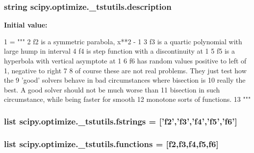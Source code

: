 \subsubsection[{description}]{\setlength{\rightskip}{0pt plus 5cm}string scipy.\+optimize.\+\_\+tstutils.\+description}\label{namespacescipy_1_1optimize_1_1__tstutils_aa462cb2cefb11320f53df0f3880533d1}
{\bfseries Initial value\+:}
\begin{DoxyCode}
1 = \textcolor{stringliteral}{"""}
2 \textcolor{stringliteral}{f2 is a symmetric parabola, x**2 - 1}
3 \textcolor{stringliteral}{f3 is a quartic polynomial with large hump in interval}
4 \textcolor{stringliteral}{f4 is step function with a discontinuity at 1}
5 \textcolor{stringliteral}{f5 is a hyperbola with vertical asymptote at 1}
6 \textcolor{stringliteral}{f6 has random values positive to left of 1, negative to right}
7 \textcolor{stringliteral}{}
8 \textcolor{stringliteral}{of course these are not real problems. They just test how the}
9 \textcolor{stringliteral}{'good' solvers behave in bad circumstances where bisection is}
10 \textcolor{stringliteral}{really the best. A good solver should not be much worse than}
11 \textcolor{stringliteral}{bisection in such circumstance, while being faster for smooth}
12 \textcolor{stringliteral}{monotone sorts of functions.}
13 \textcolor{stringliteral}{"""}
\end{DoxyCode}
\hypertarget{namespacescipy_1_1optimize_1_1__tstutils_ad08e844e2ba22aee629d4ab185e769bd}{}
\subsubsection[{fstrings}]{\setlength{\rightskip}{0pt plus 5cm}list scipy.\+optimize.\+\_\+tstutils.\+fstrings = \mbox{[}'{\bf f2}','{\bf f3}','{\bf f4}','{\bf f5}','{\bf f6}'\mbox{]}}\label{namespacescipy_1_1optimize_1_1__tstutils_ad08e844e2ba22aee629d4ab185e769bd}
\hypertarget{namespacescipy_1_1optimize_1_1__tstutils_aa538ac08b578db63df31a1cb775ba16e}{}
\subsubsection[{functions}]{\setlength{\rightskip}{0pt plus 5cm}list scipy.\+optimize.\+\_\+tstutils.\+functions = \mbox{[}{\bf f2},{\bf f3},{\bf f4},{\bf f5},{\bf f6}\mbox{]}}\label{namespacescipy_1_1optimize_1_1__tstutils_aa538ac08b578db63df31a1cb775ba16e}
\hypertarget{namespacescipy_1_1optimize_1_1__tstutils_a3a3b977dda41ffaa683edb0e9007da87}{}
